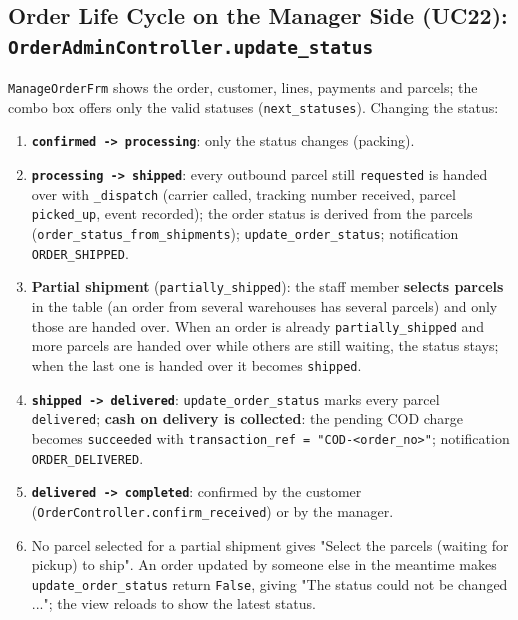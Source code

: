 \hypertarget{flow-orderlife}{%
\subsection{\texorpdfstring{Order Life Cycle on the Manager Side (UC22):
\texttt{OrderAdminController.\allowbreak{}update\_\allowbreak{}status}}{Order Life Cycle on the Manager Side (UC22): OrderAdminController.update\_status}}\label{flow-orderlife}}

\texttt{ManageOrderFrm} shows the order, customer, lines, payments and
parcels; the combo box offers only the valid statuses
(\texttt{next\_\allowbreak{}statuses}). Changing the status:

\begin{enumerate}
\def\labelenumi{\arabic{enumi}.}
\tightlist
\item
  \textbf{\texttt{confirmed -\textgreater{}\allowbreak{} processing}}: only the
  status changes (packing).
\item
  \textbf{\texttt{processing -\textgreater{}\allowbreak{} shipped}}: every outbound
  parcel still \texttt{requested} is handed over with
  \texttt{\_\allowbreak{}dispatch} (carrier called, tracking number received, parcel
  \texttt{picked\_\allowbreak{}up}, event recorded); the order status is derived from
  the parcels (\texttt{order\_\allowbreak{}status\_\allowbreak{}from\_\allowbreak{}shipments});
  \texttt{update\_\allowbreak{}order\_\allowbreak{}status}; notification \texttt{ORDER\_\allowbreak{}SHIPPED}.
\item
  \textbf{Partial shipment} (\texttt{partially\_\allowbreak{}shipped}): the staff
  member \textbf{selects parcels} in the table (an order from several
  warehouses has several parcels) and only those are handed over. When
  an order is already \texttt{partially\_\allowbreak{}shipped} and more parcels are
  handed over while others are still waiting, the status stays; when the
  last one is handed over it becomes \texttt{shipped}.
\item
  \textbf{\texttt{shipped -\textgreater{}\allowbreak{} delivered}}:
  \texttt{update\_\allowbreak{}order\_\allowbreak{}status} marks every parcel \texttt{delivered};
  \textbf{cash on delivery is collected}: the pending COD charge becomes
  \texttt{succeeded} with
  \texttt{transaction\_\allowbreak{}ref =\allowbreak{} "COD-\textless{}order\_\allowbreak{}no\textgreater{}\allowbreak{}"};
  notification \texttt{ORDER\_\allowbreak{}DELIVERED}.
\item
  \textbf{\texttt{delivered -\textgreater{}\allowbreak{} completed}}: confirmed by
  the customer (\texttt{OrderController.\allowbreak{}confirm\_\allowbreak{}received}) or by the
  manager.
\item
  No parcel selected for a partial shipment gives "Select the parcels
  (waiting for pickup) to ship". An order updated by someone else in the
  meantime makes \texttt{update\_\allowbreak{}order\_\allowbreak{}status} return \texttt{False},
  giving "The status could not be changed ..."; the view reloads to show
  the latest status.
\end{enumerate}

